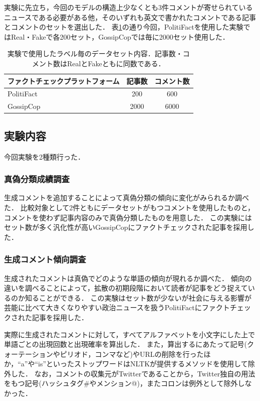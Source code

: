 実験に先立ち，今回のモデルの構造上少なくとも3件コメントが寄せられているニュースである必要がある他，そのいずれも英文で書かれたコメントである記事とコメントのセットを選出した．
表\ref{tbl:dataset}の通り今回，PolitiFactを使用した実験ではReal・Fakeで各200セット，GossipCopでは毎に2000セット使用した．

\begin{table}[p]
    \caption{実験で使用したラベル毎のデータセット内容．記事数・コメント数はRealとFakeともに同数である．}
    \label{tbl:dataset}
    \centering
    \begin{tabular}{lcc}
        \hline
        ファクトチェックプラットフォーム     & 記事数 & コメント数 \\ \hline
        PolitiFact & 200   & 600   \\
        GossipCop  & 2000  & 6000  \\ \hline
    \end{tabular}
\end{table}

\subsection{実験内容}
\label{sec:exp_contents}
今回実験を2種類行った．

\subsubsection{真偽分類成績調査}
生成コメントを追加することによって真偽分類の傾向に変化がみられるか調べた．
比較対象として2件ともにデータセットがもつコメントを使用したものと，コメントを使わず記事内容のみで真偽分類したものを用意した．
この実験にはセット数が多く汎化性が高いGossipCopにファクトチェックされた記事を採用した．

\subsubsection{生成コメント傾向調査}
生成されたコメントは真偽でどのような単語の傾向が現れるか調べた．
傾向の違いを調べることによって，拡散の初期段階において読者が記事をどう捉えているのか知ることができる．
この実験はセット数が少ないが社会に与える影響が芸能に比べて大きくなりやすい政治ニュースを扱うPolitiFactにファクトチェックされた記事を採用した．

実際に生成されたコメントに対して，すべてアルファベットを小文字にした上で単語ごとの出現回数と出現確率を算出した．
また，算出するにあたって記号(クォーテーションやピリオド，コンマなど)やURLの削除を行ったほか，``a''や``is''といったストップワードはNLTK\cite{bird-loper-2004-nltk}が提供するメソッドを使用して除外した．
なお，コメントの収集元がTwitterであることから，Twitter独自の用法をもつ記号(ハッシュタグ\#やメンション@)，またコロンは例外として除外しなかった．

